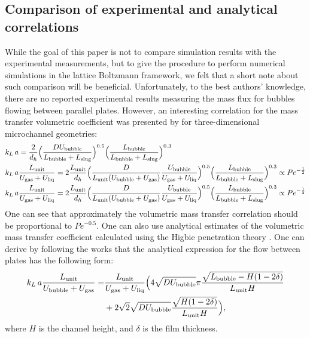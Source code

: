 \documentclass{article}
\newcommand{\beq}{\begin{equation}}
\newcommand{\feq}{\end{equation}}
\newcommand{\beqal}{\begin{equation}\begin{aligned}}
\newcommand{\feqal}{\end{aligned}\end{equation}}
\newcommand{\vol}{k_L\,a}
\newcommand{\lbubble}{L_{\mathrm{bubble}}}
\newcommand{\lunit}{L_{\mathrm{unit}}}
\newcommand{\lslug}{L_{\mathrm{slug}}}
\newcommand{\ububble}{U_{\mathrm{bubble}}}
\newcommand{\uliq}{U_{\mathrm{liq}}}
\newcommand{\ugas}{U_{\mathrm{gas}}}
\newcommand{\volnondim}{\vol \frac{\lunit}{\ububble+\ugas}}
\begin{document}
\subsection{Comparison of experimental and analytical correlations}
While the goal of this paper is not to compare simulation results with the experimental measurements, but to give the
procedure to perform numerical simulations  in the lattice Boltzmann framework, we felt that a
short note about such comparison will be beneficial.
Unfortunately, to the best authors' knowledge, there are no reported experimental results measuring the mass flux for
  bubbles flowing between parallel plates. However, an interesting
correlation for the mass transfer volumetric coefficient was presented by
\citet{yue-mass} for three-dimensional microchannel geometries:
\beqal
&\vol=\frac{2}{d_h}\Bigl(\frac{D \ububble}{\lbubble+\lslug}\Bigr)^{0.5}
\Bigl(\frac{\lbubble}{\lbubble+\lslug}\Bigr)^{0.3}\\
&\vol \frac{\lunit}{\ugas+\uliq}=2\frac{\lunit}{d_h} \Bigl(\frac{D 
}{\lunit (\ububble+\ugas)} \frac{\ububble}{\ugas+\uliq}\Bigr)^{0.5}
\Bigl(\frac{\lbubble}{\lbubble+\lslug}\Bigr)^{0.3} \propto Pe^{-\frac{1}{2}}\\
&\vol \frac{\lunit}{\ugas+\uliq}=2\frac{\lunit}{d_h} \Bigl(\frac{D 
}{\lunit (\ububble+\ugas)} \frac{\ububble}{\ugas+\uliq}\Bigr)^{0.5}
\Bigl(\frac{\lbubble}{\lbubble+\lslug}\Bigr)^{0.3} \propto Pe^{-\frac{1}{2}}
\feqal
One can see that approximately the volumetric mass transfer correlation should be proportional to
$Pe^{-0.5}$.  One can also use analytical estimates of the volumetric mass transfer
coefficient calculated using the Higbie penetration theory \cite{higbie}. One can derive by following the works
\cite{irandoust,vanbaten-circular} that the analytical expression for the flow between plates has
the following form:
\beq
\label{vanbaten:analytical:expresssion}
\begin{aligned}
\volnondim=&\frac{\lunit}{\ugas+\uliq}\Bigl(4 \sqrt{D \ububble}{\pi}
\frac{\sqrt{\lbubble-H (1-2\delta)}}{\lunit H}\\
&+2 \sqrt{2} \sqrt{D \ububble} \frac{\sqrt{H
(1-2\delta)}}{\lunit H}\Bigr),
\end{aligned}
\feq
where $H$ is the channel height, and $\delta$ is the film thickness.
\end{document}
